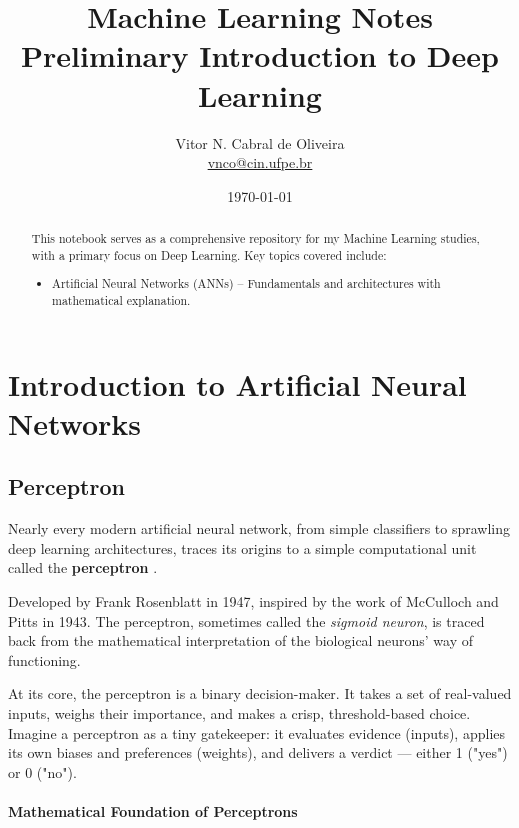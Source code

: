 \documentclass{tufte-handout}
\title{Machine Learning Notes \\ Preliminary Introduction to Deep Learning}
\author{Vitor N. Cabral de Oliveira\\ \href{mailto:vnco@cin.ufpe.br}{vnco@cin.ufpe.br}}
\date{\today}
\begin{document}
\maketitle
\begin{abstract}
    This notebook serves as a comprehensive repository for my Machine Learning studies, with a primary focus on Deep Learning. Key topics covered include:
    \begin{itemize}
        \item Artificial Neural Networks (ANNs) – Fundamentals and architectures with mathematical explanation.
    \end{itemize}
\end{abstract}

\newpage
\hypersetup{linkcolor=wp-text}
\tableofcontents
\hypersetup{linkcolor=wp-primary}
\newpage

\section{Introduction to Artificial Neural Networks}

\subsection{Perceptron}

Nearly every modern artificial neural network, from simple classifiers to sprawling deep learning architectures, traces its origins to a simple computational unit called the \textbf{perceptron} .

Developed by Frank Rosenblatt in 1947, inspired by the work of McCulloch and Pitts in 1943. The perceptron, sometimes called the \textit{sigmoid neuron}, is traced back from the mathematical interpretation of the biological neurons' way of functioning.

At its core, the perceptron is a binary decision-maker. It takes a set of real-valued inputs, weighs their importance, and makes a crisp, threshold-based choice. Imagine a perceptron as a tiny gatekeeper: it evaluates evidence (inputs), applies its own biases and preferences (weights), and delivers a verdict --- either 1 ("yes") or 0 ("no").

\paragraph{Mathematical Foundation of Perceptrons}
\end{document}
